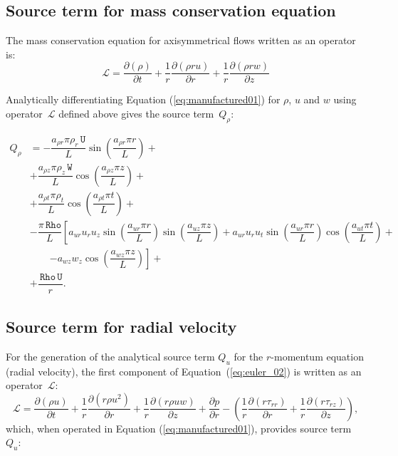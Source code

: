 \documentclass[10pt]{article}
\newcommand{\Diff}[2] {\dfrac{\partial( #1)}{\partial #2}}
\newcommand{\diff}[2] {\dfrac{\partial #1}{\partial #2}}
\newcommand{\Lo}{\,\mathcal{L}}
\newcommand{\Rho}{\,\mathtt{Rho}}
\newcommand{\U}{\,\mathtt{U}}
\newcommand{\W}{\,\mathtt{W}}
\begin{document}
\subsection{Source term for mass conservation equation}

The mass conservation equation for axisymmetrical flows written as an operator is:
\begin{equation*}
 \Lo=  \Diff{\rho}{t}+  \dfrac{1}{r} \Diff{\rho r u}{r}+ \dfrac{1}{r}\Diff{\rho r w}{z}
\end{equation*}

Analytically differentiating Equation (\ref{eq:manufactured01}) for $\rho$, $u$ and $w$ using operator $\Lo$ defined above gives  the source term~$Q_{\rho}$:

\begin{equation}
 \begin{split}
Q_\rho &= -\dfrac{a_{\rho r} \pi \rho_r \U }{L}\sin\left(\dfrac{a_{\rho r} \pi r}{L}\right)+ \\
&+\dfrac{a_{\rho z} \pi \rho_z \W }{L}\cos\left(\dfrac{a_{\rho z} \pi z}{L}\right)+ \\
&+\dfrac{a_{\rho t} \pi \rho_t }{L}\cos\left(\dfrac{a_{\rho t} \pi t}{L}\right)+ \\
&-\dfrac{\pi \Rho}{L}\left[ a_{ur} u_r u_z \sin\left(\dfrac{a_{ur} \pi r}{L}\right) \sin\left(\dfrac{a_{uz} \pi z}{L}\right)+a_{ur} u_r u_t \sin\left(\dfrac{a_{ur} \pi r}{L}\right) \cos\left(\dfrac{a_{ut} \pi t}{L}\right)\right.+\\
&  \quad\quad\left. -a_{wz} w_z \cos\left(\dfrac{a_{wz} \pi z}{L}\right)\right] + \\
&+\dfrac{\Rho \U}{r}.
\end{split}
\end{equation}
%
\subsection{Source term for radial velocity}

For the generation of the analytical source term $Q_u$ for the $r$-momentum equation (radial velocity), the first component of Equation~(\ref{eq:euler_02}) is written as an  operator $\Lo$:
\begin{equation*}
 \Lo= \Diff{\rho u}{t} +\dfrac{1}{r}\Diff{r \rho u^2 }{r}+ \dfrac{1}{r}\Diff{r \rho u w }{z}+\diff{p}{r}-\left(\dfrac{1}{r}\Diff{r \tau_{rr}}{r}+\dfrac{1}{r}\Diff{r \tau_{rz}}{z}\right),
\end{equation*}
which, when operated in Equation (\ref{eq:manufactured01}), provides source term $Q_{u}$:
\end{document}
